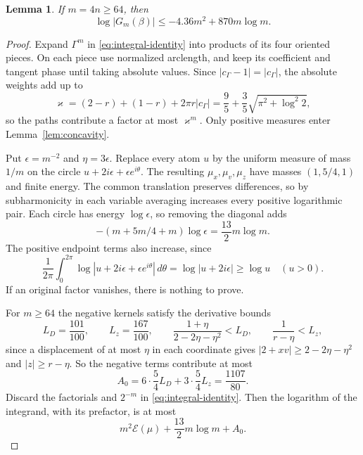 \documentclass{amsart}
\newtheorem{lemma}{Lemma}[section]
\numberwithin{equation}{section}
\numberwithin{table}{section}
\begin{document}
\begin{lemma}\label{lem:analytic-bound}
If $m=4n\ge64$, then
\begin{equation*}
 \log|G_m(\beta)|\le-4.36m^2+870m\log m.
\end{equation*}
\end{lemma}
\begin{proof}
Expand $\Gamma^m$ in \eqref{eq:integral-identity} into products of its four
oriented pieces. On each piece use normalized arclength, and keep its
coefficient and tangent phase until taking absolute values. Since
$|c_\Gamma-1|=|c_\Gamma|$, the absolute weights add up to
\begin{equation*}
 \varkappa=(2-r)+(1-r)+2\pi r|c_\Gamma|
   =\frac95+\frac35\sqrt{\pi^2+\log^2 2},
\end{equation*}
so the paths contribute a factor at most $\varkappa^m$. Only positive
measures enter Lemma~\ref{lem:concavity}.

Put $\epsilon=m^{-2}$ and $\eta=3\epsilon$. Replace every atom $u$ by the
uniform measure of mass $1/m$ on the circle
$u+2i\epsilon+\epsilon e^{i\theta}$. The resulting $\mu_x,\mu_v,\mu_z$
have masses $(1,5/4,1)$ and finite energy. The common translation
preserves differences, so by subharmonicity in each variable averaging
increases every positive logarithmic pair. Each circle has energy
$\log\epsilon$, so removing the diagonal adds
\begin{equation*}
 -(m+5m/4+m)\log\epsilon=\frac{13}{2}m\log m.
\end{equation*}
The positive endpoint terms also increase, since
\begin{equation}\label{eq:circle-mean-endpoint}
 \frac1{2\pi}\int_0^{2\pi}
 \log|u+2i\epsilon+\epsilon e^{i\theta}|\,d\theta
 =\log|u+2i\epsilon|\ge\log u\quad(u>0).
\end{equation}
If an original factor vanishes, there is nothing to prove.

For $m\ge64$ the negative kernels satisfy the derivative bounds
\begin{equation}\label{eq:smooth-derivatives}
 L_D=\frac{101}{100},\qquad L_z=\frac{167}{100},\qquad
 \frac{1+\eta}{2-2\eta-\eta^2}<L_D,\qquad\frac1{r-\eta}<L_z,
\end{equation}
since a displacement of at most $\eta$ in each coordinate gives
$|2+xv|\ge2-2\eta-\eta^2$ and $|z|\ge r-\eta$. So the negative terms
contribute at most
\begin{equation*}
 A_0=6\cdot\frac54 L_D+3\cdot\frac54 L_z=\frac{1107}{80}.
\end{equation*}
Discard the factorials and $2^{-m}$ in \eqref{eq:integral-identity}. Then
the logarithm of the integrand, with its prefactor, is at most
\begin{equation}\label{eq:smoothed-integrand}
 m^2\mathcal E(\mu)+\frac{13}{2}m\log m+A_0.
\end{equation}


\end{proof}
\end{document}
